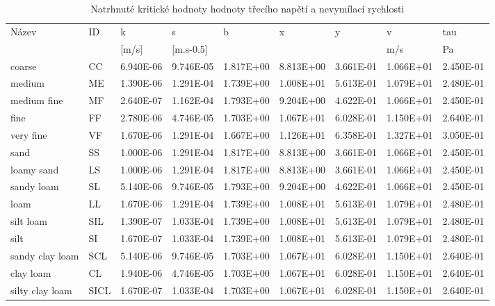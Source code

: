 \begin{sidewaystable}
% 
\centering
\caption{Natrhnuté kritické hodnoty hodnoty třecího napětí a nevymílací rychlosti }
\label{tab:kriticke}
{\small 
\begin{tabular}{lllllllll}
\hline \hline
Název           & ID       & k         & s             & b      & x       & y      & v     & tau   \\
                &          & {[}m/s{]} & {[}m.s-0.5{]} &        &         &        & m/s   & Pa    \\
\hline 
coarse          & CC   & 6.940E-06 & 9.746E-05 & 1.817E+00 & 8.813E+00 & 3.661E-01 & 1.066E+01 & 2.450E-01 \\
medium          & ME   & 1.390E-06 & 1.291E-04 & 1.739E+00 & 1.008E+01 & 5.613E-01 & 1.079E+01 & 2.480E-01 \\
medium fine     & MF   & 2.640E-07 & 1.162E-04 & 1.793E+00 & 9.204E+00 & 4.622E-01 & 1.066E+01 & 2.450E-01 \\
fine            & FF   & 2.780E-06 & 4.746E-05 & 1.703E+00 & 1.067E+01 & 6.028E-01 & 1.150E+01 & 2.640E-01 \\
very fine       & VF   & 1.670E-06 & 1.291E-04 & 1.667E+00 & 1.126E+01 & 6.358E-01 & 1.327E+01 & 3.050E-01 \\
sand            & SS   & 1.000E-06 & 1.291E-04 & 1.817E+00 & 8.813E+00 & 3.661E-01 & 1.066E+01 & 2.450E-01 \\
loamy sand      & LS   & 1.000E-06 & 1.291E-04 & 1.817E+00 & 8.813E+00 & 3.661E-01 & 1.066E+01 & 2.450E-01 \\
sandy loam      & SL   & 5.140E-06 & 9.746E-05 & 1.793E+00 & 9.204E+00 & 4.622E-01 & 1.066E+01 & 2.450E-01 \\
loam            & LL   & 1.670E-06 & 1.291E-04 & 1.739E+00 & 1.008E+01 & 5.613E-01 & 1.079E+01 & 2.480E-01 \\
silt loam       & SIL  & 1.390E-07 & 1.033E-04 & 1.739E+00 & 1.008E+01 & 5.613E-01 & 1.079E+01 & 2.480E-01 \\
silt            & SI   & 1.670E-07 & 1.033E-04 & 1.739E+00 & 1.008E+01 & 5.613E-01 & 1.079E+01 & 2.480E-01 \\
sandy clay loam & SCL  & 5.140E-06 & 9.746E-05 & 1.703E+00 & 1.067E+01 & 6.028E-01 & 1.150E+01 & 2.640E-01 \\
clay loam       & CL   & 1.940E-06 & 4.746E-05 & 1.703E+00 & 1.067E+01 & 6.028E-01 & 1.150E+01 & 2.640E-01 \\
silty clay loam & SICL & 1.670E-07 & 1.033E-04 & 1.703E+00 & 1.067E+01 & 6.028E-01 & 1.150E+01 & 2.640E-01 \\

\end{tabular}}
\end{sidewaystable}
